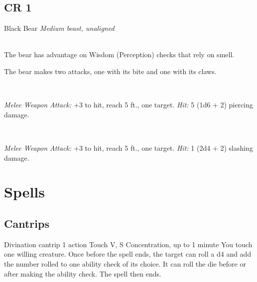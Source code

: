 \documentclass[10pt,twoside,twocolumn,openany]{book}
\begin{document}
\section{CR 1}
\begin{monsterboxnobg}{Black Bear}
	\textit{Medium beast, unaligned}\\
	\hline
	\basics[%
	armorclass = 11 (natural armor),
	hitpoints  = 19 (3d8 + 6),
	speed      = {40 ft., climb 30 ft.}
	]
	\hline
	\stats[
    STR = \stat{15}, %
    DEX = \stat{10},
    CON = \stat{14},
    INT = \stat{2},
    WIS = \stat{12},
    CHA = \stat{7}
	]
	\hline
	\details[%
	skills = Perception +3,
	senses = passive Perception 11,
	challenge = ?
	]
	\hline \\[1mm]
	\begin{monsteraction}
		The bear has advantage on Wisdom (Perception) checks that rely on smell.
	\end{monsteraction}
	\begin{monsteraction}[Multiattack]
		The bear makes two attacks, one with its bite and one with its claws.
	\end{monsteraction}\\
	\begin{monsteraction}[Bite]
		\textit{Melee Weapon Attack:} +3 to hit, reach 5 ft., one target. \textit{Hit:} 5 (1d6 + 2) piercing damage.
	\end{monsteraction}\\
	\begin{monsteraction}[Claws]
		\textit{Melee Weapon Attack:} +3 to hit, reach 5 ft., one target. \textit{Hit:} 1 (2d4 + 2) slashing damage.
	\end{monsteraction}	
\end{monsterboxnobg}

\chapter{Spells}
\section{Cantrips}
{Divination cantrip}
{\color{action} 1 action}
{Touch}
{V, S}
{Concentration, up to 1 minute}
%
You touch one willing creature. Once before the spell ends, the target can roll a d4 and add the number rolled to one ability check of its choice. It can roll the die before or after making the ability check. The spell then ends. 
\end{document}
